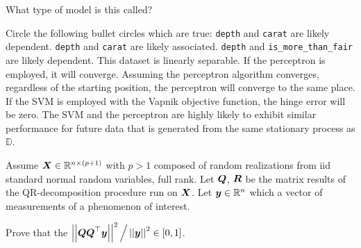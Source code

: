 \documentclass[12pt]{article}
\begin{document}
 What type of model is this called? 

Circle the following bullet circles which are true:
 \texttt{depth} and \texttt{carat} are likely dependent.  
 \texttt{depth} and \texttt{carat} are likely associated. 
 \texttt{depth} and \texttt{is\_more\_than\_fair} are likely dependent. 
 This dataset is linearly separable.
 If the perceptron is employed, it will converge.  
 Assuming the perceptron algorithm converges, regardless of the starting position, the perceptron will converge to the same place.  
 If the SVM is employed with the Vapnik objective function, the hinge error will be zero. 
 The SVM and the perceptron are highly likely to exhibit similar performance for future data that is generated from the same stationary process as $\mathbb{D}$. 


\eenum
\pagebreak

\problem Assume $\boldsymbol{X} \in \mathbb{R}^{n \times (p+1)}$ with $p >1$ composed of random realizations from iid standard normal random variables, full rank. Let $\boldsymbol{Q}$, $\boldsymbol{R}$ be the matrix results of the QR-decomposition procedure run on $\boldsymbol{X}$. Let $\boldsymbol{y} \in \mathbb{R}^n$ which a vector of measurements of a phenomenon of interest.  %

\benum
{} Prove that the $\left|\left|\boldsymbol{Q}\boldsymbol{Q}^\top\boldsymbol{y}\right|\right|^2 \Big/ \left|\left|\boldsymbol{y}\right|\right|^2 \in \left[0,1\right]$.\\

\vspace{8cm}
\end{document}
